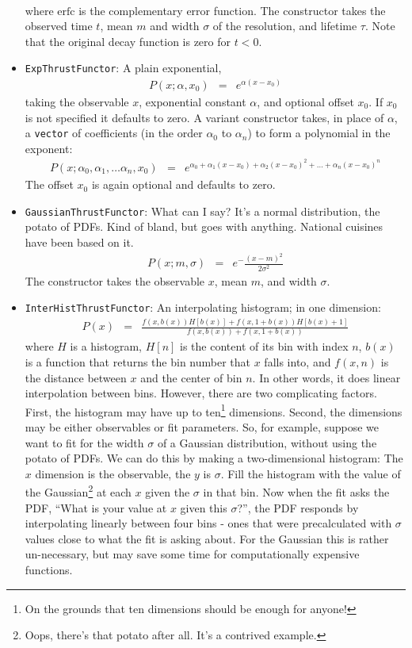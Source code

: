 \documentclass[12pt,pdflatex]{article}
\begin{document}
\begin{itemize}
\begin{eqnarray}
\end{eqnarray}
where $\mathrm{erfc}$ is the complementary error function. The constructor
takes the observed time $t$, mean $m$ and width $\sigma$ of the resolution,
and lifetime $\tau$. Note that the original decay function is zero for $t<0$. 
\item \texttt{ExpThrustFunctor}: A plain exponential,
\begin{eqnarray}
P(x;\alpha, x_0) &=& e^{\alpha(x-x_0)}
\end{eqnarray}
taking the observable $x$, exponential constant $\alpha$, and optional offset $x_0$.
If $x_0$ is not specified it defaults to zero. A variant constructor takes, in place
of $\alpha$, a \texttt{vector} of coefficients (in the order $\alpha_0$ to $\alpha_n$) 
to form a polynomial in the exponent:
\begin{eqnarray}
P(x;\alpha_0, \alpha_1, \ldots \alpha_n, x_0) &=& e^{\alpha_0 + \alpha_1(x-x_0) + \alpha_2(x-x_0)^2 + \ldots + \alpha_n(x-x_0)^n}
\end{eqnarray}
The offset $x_0$ is again optional and defaults to zero. 
\item \texttt{GaussianThrustFunctor}: What can I say? It's a normal distribution, the potato
of PDFs. Kind of bland, but goes with anything. National cuisines have been based on it.  
\begin{eqnarray}
P(x;m,\sigma) &=& e^-\frac{(x-m)^2}{2\sigma^2}
\end{eqnarray}
The constructor takes the observable $x$, mean $m$, and width $\sigma$. 
\item \texttt{InterHistThrustFunctor}: An interpolating histogram; in one dimension:
\begin{eqnarray}
P(x) &=& \frac{f(x, b(x))H[b(x)] + f(x, 1 + b(x))H[b(x) + 1]}{f(x, b(x)) + f(x, 1 + b(x))}
\end{eqnarray}
where $H$ is a histogram, $H[n]$ is the content of its bin with index $n$, 
$b(x)$ is a function that returns the bin number that $x$ falls into,
and $f(x, n)$ is the distance between $x$ and the center of bin $n$. 
In other words, it does linear interpolation between bins. However,
there are two complicating factors. First, the histogram may have
up to ten\footnote{On the grounds that ten dimensions should be enough for anyone!} dimensions.
Second, the dimensions may be either observables or fit parameters. 
So, for example, suppose we want to fit for the width $\sigma$ of a Gaussian
distribution, without using the potato of PDFs. We can do this by making
a two-dimensional histogram: The $x$ dimension is the observable, the $y$
is $\sigma$. Fill the histogram with the value of the Gaussian\footnote{Oops, there's
that potato after all. It's a contrived example.} at each $x$ given the $\sigma$
in that bin. Now when the fit asks the PDF, ``What is your value at $x$ given this $\sigma$?'',
the PDF responds by interpolating linearly between four bins - ones that were precalculated
with $\sigma$ values close to what the fit is asking about. For the Gaussian this is
rather un-necessary, but may save some time for computationally expensive functions. 


\end{itemize}
\end{document}
